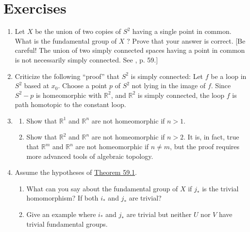 \section*{Exercises}
\begin{enumerate}[itemsep=0.4em, parsep=0pt, topsep=0pt, partopsep=0pt, leftmargin=*, label=\arabic*., ref=\arabic*]
\item Let \(X\) be the union of two copies of \(S^{2}\) having a single point in common. What is the fundamental group of \(X\) ? Prove that your answer is correct. [Be careful! The union of two simply connected spaces having a point in common is not necessarily simply connected. See \cite{Spanier1966}, p. 59.]
\item Criticize the following ``proof'' that \(S^{2}\) is simply connected: Let \(f\) be a loop in \(S^{2}\) based at \(x_{0}\). Choose a point \(p\) of \(S^{2}\) not lying in the image of \(f\). Since \(S^{2} - p\) is homeomorphic with \(\mathbb{R}^{2}\), and \(\mathbb{R}^{2}\) is simply connected, the loop \(f\) is path homotopic to the constant loop.
\item
 \begin{enumerate}[itemsep=0.2em, parsep=0pt, topsep=0pt, partopsep=0pt, leftmargin=*, label=(\alph*), align=left]
 \item Show that \(\mathbb{R}^{1}\) and \(\mathbb{R}^{n}\) are not homeomorphic if \(n > 1\).

 \item Show that \(\mathbb{R}^{2}\) and \(\mathbb{R}^{n}\) are not homeomorphic if \(n > 2\). It is, in fact, true that \(\mathbb{R}^{m}\) and \(\mathbb{R}^{n}\) are not homeomorphic if \(n \neq m\), but the proof requires more advanced tools of algebraic topology.
 \end{enumerate}
\item Assume the hypotheses of \hyperref[thm:59.1]{Theorem 59.1}.
 \begin{enumerate}[itemsep=0.2em, parsep=0pt, topsep=0pt, partopsep=0pt, leftmargin=*, label=(\alph*), align=left]
 \item What can you say about the fundamental group of \(X\) if \(j_{ * }\) is the trivial homomorphism? If both \(i_{ * }\) and \(j_{ * }\) are trivial?
 \item Give an example where \(i_{ * }\) and \(j_{ * }\) are trivial but neither \(U\) nor \(V\) have trivial fundamental groups.
 \end{enumerate}
\end{enumerate}

